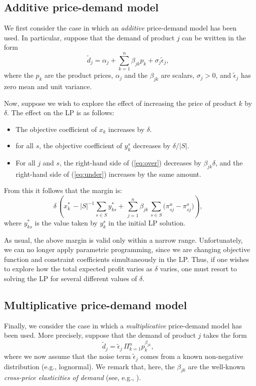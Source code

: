 \documentclass[a4paper,11pt]{article}
\begin{document}
\subsection{Additive price-demand model} \label{sub:price1}

We first consider the case in which an \emph{additive} price-demand model has been used. In particular, suppose that the demand of product $j$ can be written in the form
\[
\tilde{d}_j = \alpha_j + \sum_{k=1}^n \beta_{jk} p_k
+ \sigma_j \tilde{\epsilon}_j,
\]
where the $p_k$ are the product prices, $\alpha_j$ and the $\beta_{jk}$ are scalars, $\sigma_j > 0$, and $\tilde{\epsilon}_j$ has zero mean and unit variance.

Now, suppose we wish to explore the effect of increasing the price of product $k$ by $\delta$. The effect on the LP is as follows:
\begin{itemize}
\item The objective coefficient of $x_k$ increases by $\delta$.
\item for all $s$, the objective coefficient of $y_k^s$ decreases by $\delta/|S|$.
\item For all $j$ and $s$, the right-hand side of (\ref{eq:over}) decreases by $\beta_{jk} \delta$, and the right-hand side of (\ref{eq:under}) increases by the same amount.
\end{itemize}
From this it follows that the margin is:
\[
\delta \, 
\left( x^*_k \, - |S|^{-1} \sum_{s \in S} y^*_{ks}
+ \, \sum_{j=1}^n \beta_{jk} \,
\sum_{s \in S} \big( \pi_{sj}^u - \pi_{sj}^o \big)
\right),
\]
where $y^*_{ks}$ is the value taken by $y_k^s$ in the initial LP solution.

As usual, the above margin is valid only within a narrow range. Unfortunately, we can no longer apply parametric programming, since we are changing objective function and constraint coefficients simultaneously in the LP. Thus, if one wishes to explore how the total expected profit varies as $\delta$ varies, one must resort to solving the LP for several different values of $\delta$.

\subsection{Multiplicative price-demand model} \label{sub:price2}

Finally, we consider the case in which a \emph{multiplicative} price-demand model has been used. More precisely, suppose that the demand of product $j$ takes the form
\[
\tilde{d}_j = \tilde{\epsilon}_j \, \Pi_{k=1}^n p_k^{\beta_{jk}},
\]
where we now assume that the noise term $\tilde{\epsilon}_j$ comes from a known non-negative distribution (e.g., lognormal). We remark that, here, the $\beta_{jk}$ are the well-known
\emph{cross-price elasticities of demand} (see, e.g., \cite{FC13}).
\end{document}
